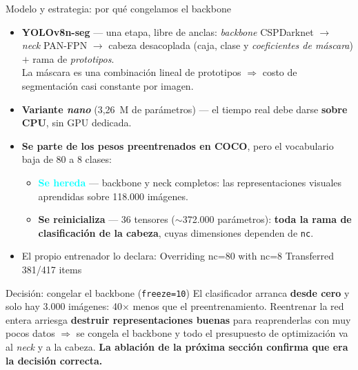 \documentclass[aspectratio=169,11pt]{beamer}
\begin{document}
\begin{frame}{Modelo y estrategia: por qué congelamos el backbone}
  \begin{itemize}\footnotesize
    \item \textbf{YOLOv8n-seg} --- una etapa, libre de anclas: \emph{backbone} CSPDarknet
          $\rightarrow$ \emph{neck} PAN-FPN $\rightarrow$ cabeza desacoplada (caja, clase y
          \emph{coeficientes de máscara}) $+$ rama de \emph{prototipos}.
          \\{\scriptsize La máscara es una combinación lineal de prototipos
          $\Rightarrow$ costo de segmentación casi constante por imagen.}
    \item \textbf{Variante \emph{nano}} (3,26~M de parámetros) --- el tiempo real debe darse
          \textbf{sobre CPU}, sin GPU dedicada.
    \item \textbf{Se parte de los pesos preentrenados en COCO}, pero el vocabulario baja de
          80 a 8 clases:
      \begin{itemize}\scriptsize
        \item[\textcolor{aqua}{$\blacktriangleright$}] \textcolor{aqua}{\textbf{Se hereda}}
              --- backbone y neck completos: las representaciones visuales aprendidas sobre
              118.000 imágenes.
        \item[\textcolor{rojo}{$\blacktriangleright$}]
              \textcolor{rojo}{\textbf{Se reinicializa}} --- 36 tensores
              ($\sim$372.000 parámetros): \textbf{toda la rama de clasificación de la
              cabeza}, cuyas dimensiones dependen de \texttt{nc}.
      \end{itemize}
    \item El propio entrenador lo declara:
          {\ttfamily\scriptsize\color{gris}Overriding nc=80 with nc=8\quad
          \color{rojo}Transferred 381/417 items}
  \end{itemize}

  \vspace{0.3em}
  \begin{alertblock}{Decisión: congelar el backbone (\texttt{freeze=10})}
    \footnotesize
    El clasificador arranca \textbf{desde cero} y solo hay 3.000 imágenes: 40$\times$ menos
    que el preentrenamiento. Reentrenar la red entera arriesga \textbf{destruir
    representaciones buenas} para reaprenderlas con muy pocos datos $\Rightarrow$ se congela
    el backbone y todo el presupuesto de optimización va al \emph{neck} y a la cabeza.
    \textbf{La ablación de la próxima sección confirma que era la decisión correcta.}
  \end{alertblock}
\end{frame}
\end{document}
